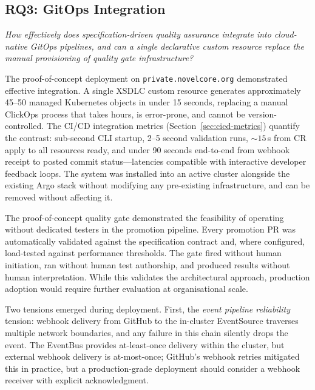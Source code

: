 \subsection{RQ3: GitOps Integration}
\label{subsec:discuss-rq3}

\textit{How effectively does specification-driven quality assurance integrate into cloud-native GitOps pipelines, and can a single declarative custom resource replace the manual provisioning of quality gate infrastructure?}

The proof-of-concept deployment on \texttt{private.novelcore.org} demonstrated effective integration. A single XSDLC custom resource generates approximately 45--50 managed Kubernetes objects in under 15 seconds, replacing a manual ClickOps process that takes hours, is error-prone, and cannot be version-controlled. The CI/CD integration metrics (Section~\ref{sec:cicd-metrics}) quantify the contrast: sub-second CLI startup, 2--5 second validation runs, \({\sim}15\)\,s from CR apply to all resources ready, and under 90 seconds end-to-end from webhook receipt to posted commit status---latencies compatible with interactive developer feedback loops. The system was installed into an active cluster alongside the existing Argo stack without modifying any pre-existing infrastructure, and can be removed without affecting it.

The proof-of-concept quality gate demonstrated the feasibility of operating without dedicated testers in the promotion pipeline. Every promotion PR was automatically validated against the specification contract and, where configured, load-tested against performance thresholds. The gate fired without human initiation, ran without human test authorship, and produced results without human interpretation. While this validates the architectural approach, production adoption would require further evaluation at organisational scale.

Two tensions emerged during deployment. First, the \textit{event pipeline reliability} tension: webhook delivery from GitHub to the in-cluster EventSource traverses multiple network boundaries, and any failure in this chain silently drops the event. The EventBus provides at-least-once delivery within the cluster, but external webhook delivery is at-most-once; GitHub's webhook retries mitigated this in practice, but a production-grade deployment should consider a webhook receiver with explicit acknowledgment.


